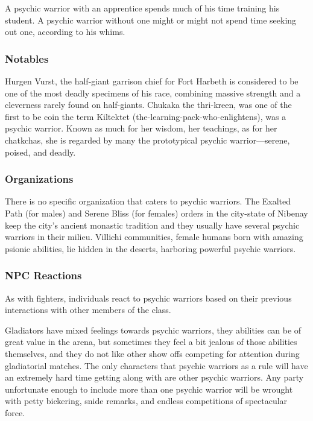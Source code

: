 A psychic warrior with an apprentice spends much of his time training his student. A psychic warrior without one might or might not spend time seeking out one, according to his whims.

\subsubsection{Notables}

Hurgen Vurst, the half-giant garrison chief for Fort Harbeth is considered to be one of the most deadly specimens of his race, combining massive strength and a cleverness rarely found on half-giants. Chukaka the thri-kreen, was one of the first to be coin the term Kiltektet (the-learning-pack-who-enlightens), was a psychic warrior. Known as much for her wisdom, her teachings, as for her chatkchas, she is regarded by many the prototypical psychic warrior---serene, poised, and deadly.

\subsubsection{Organizations}

There is no specific organization that caters to psychic warriors. The Exalted Path (for males) and Serene Bliss (for females) orders in the city-state of Nibenay keep the city's ancient monastic tradition and they usually have several psychic warriors in their milieu. Villichi communities, female humans born with amazing psionic abilities, lie hidden in the deserts, harboring powerful psychic warriors.

\subsubsection{NPC Reactions}

As with fighters, individuals react to psychic warriors based on their previous interactions with other members of the class.

Gladiators have mixed feelings towards psychic warriors, they abilities can be of great value in the arena, but sometimes they feel a bit jealous of those abilities themselves, and they do not like other show offs competing for attention during gladiatorial matches. The only characters that psychic warriors as a rule will have an extremely hard time getting along with are other psychic warriors. Any party unfortunate enough to include more than one psychic warrior will be wrought with petty bickering, snide remarks, and endless competitions of spectacular force.

